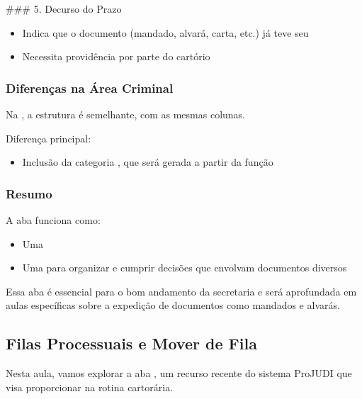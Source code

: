 \documentclass[letterpaper,10pt,brazil]{sphinxmanual}
\begin{document}
\sphinxAtStartPar
\#\#\# 5. Decurso do Prazo
\begin{itemize}
\item {} 
\sphinxAtStartPar
Indica que o documento (mandado, alvará, carta, etc.) já teve seu 

\item {} 
\sphinxAtStartPar
Necessita providência por parte do cartório

\end{itemize}


\subsubsection{Diferenças na Área Criminal}
\label{\detokenize{projud_09_outroscumprimentos:diferencas-na-area-criminal}}
\sphinxAtStartPar
Na , a estrutura é semelhante, com as mesmas colunas.

\sphinxAtStartPar
Diferença principal:
\begin{itemize}
\item {} 
\sphinxAtStartPar
Inclusão da categoria , que será gerada a partir da função 

\end{itemize}


\subsubsection{Resumo}
\label{\detokenize{projud_09_outroscumprimentos:resumo}}
\sphinxAtStartPar
A aba  funciona como:
\begin{itemize}
\item {} 
\sphinxAtStartPar
Uma 

\item {} 
\sphinxAtStartPar
Uma  para organizar e cumprir decisões que envolvam documentos diversos

\end{itemize}

\sphinxAtStartPar
Essa aba é essencial para o bom andamento da secretaria e será aprofundada em aulas específicas sobre a expedição de documentos como mandados e alvarás.

\sphinxstepscope


\subsection{Filas Processuais e Mover de Fila}
\label{\detokenize{projud_10_filasprocessuais:filas-processuais-e-mover-de-fila}}\label{\detokenize{projud_10_filasprocessuais::doc}}
\sphinxAtStartPar
Nesta aula, vamos explorar a aba , um recurso recente do sistema ProJUDI que visa proporcionar  na rotina cartorária.
\end{document}
